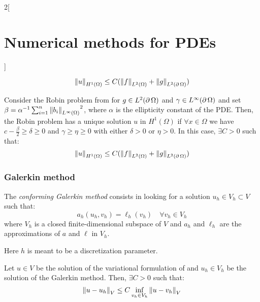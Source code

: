 \documentclass[../../../main_math.tex]{subfiles}
\begin{document}
\begin{multicols}{2}[\section{Numerical methods for PDEs}]
\begin{proposition}
    $$
      \left\|u\right\|_{H^1(\Omega)}\leq C(\left\|f\right\|_{L^2(\Omega)}+\left\|g\right\|_{L^2(\operatorname{\partial}\Omega)})
    $$
  \end{proposition}
  \begin{proposition}
    Consider the Robin problem from  for $g\in L^2(\operatorname{\partial}\Omega)$ and $\gamma\in L^\infty(\operatorname{\partial}\Omega)$ and set $\beta=\alpha^{-1}\sum_{i=1}^n{\left\|b_i\right\|_{L^\infty(\Omega)}}^2$, where $\alpha$ is the ellipticity constant of the PDE. Then, the Robin problem has a unique solution $u$ in $H^1(\Omega)$ if $\forall x\in\Omega$ we have $c-\frac{\beta}{2}\geq\delta\geq 0$ and $\gamma\geq \eta\geq 0$ with either $\delta>0$ or $\eta>0$. In this case, $\exists C>0$ such that:
    $$
      \left\|u\right\|_{H^1(\Omega)}\leq C(\left\|f\right\|_{L^2(\Omega)}+\left\|g\right\|_{L^2(\operatorname{\partial}\Omega)})
    $$
  \end{proposition}
  \subsubsection{Galerkin method}
  \begin{definition}
    The \emph{conforming Galerkin method} consists in looking for a solution $u_h\in V_h\subset V$ such that:
    $$
      a_h(u_h,v_h)=\ell_h(v_h)\quad\forall v_h\in V_h
    $$
    where $V_h$ is a closed finite-dimensional subspace of $V$ and $a_h$ and $\ell_h$ are the approximations of $a$ and $\ell$ in $V_h$.
  \end{definition}
  \begin{remark}
    Here $h$ is meant to be a discretization parameter.
  \end{remark}
  \begin{theorem}
    Let $u\in V$ be the solution of the variational formulation of  and $u_h\in V_h$ be the solution of the Galerkin method. Then, $\exists C>0$ such that:
    $$
      \left\|u-u_h\right\|_V\leq C\inf_{v_h\in V_h}\left\|u-v_h\right\|_V
    $$

  \end{theorem}

\end{multicols}
\end{document}
